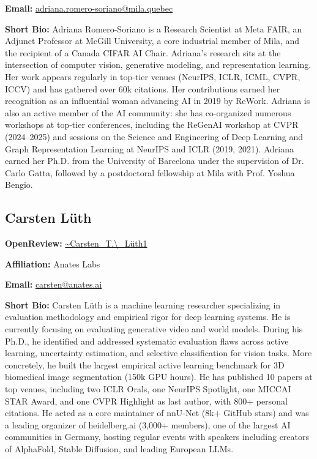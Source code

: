 \documentclass[11pt]{article}
\begin{document}
\textbf{Email:} \href{mailto:adriana.romero-soriano@mila.quebec}{adriana.romero-soriano@mila.quebec}


\textbf{Short Bio:} Adriana Romero-Soriano is a Research Scientist at Meta FAIR, an Adjunct Professor at McGill University, a core industrial member of Mila, and the recipient of a Canada CIFAR AI Chair. Adriana's research sits at the intersection of computer vision, generative modeling, and representation learning. Her work appears regularly in top-tier venues (NeurIPS, ICLR, ICML, CVPR, ICCV) and has gathered over 60k citations. Her contributions earned her recognition as an influential woman advancing AI in 2019 by ReWork. Adriana is also an active member of the AI community: she has co-organized numerous workshops at top-tier conferences, including the ReGenAI workshop at CVPR (2024--2025) and sessions on the Science and Engineering of Deep Learning and Graph Representation Learning at NeurIPS and ICLR (2019, 2021). Adriana earned her Ph.D. from the University of Barcelona under the supervision of Dr. Carlo Gatta, followed by a postdoctoral fellowship at Mila with Prof. Yoshua Bengio.


\subsection{Carsten Lüth}

\textbf{OpenReview:} \href{https://openreview.net/profile?id=\string~Carsten\_T.\_L\%C3\%BCth1}{\textasciitilde{}Carsten\_T.\textbackslash{}\_Lüth1}


\textbf{Affiliation:} Anates Labs


\textbf{Email:} \href{mailto:carsten@anates.ai}{carsten@anates.ai}


\textbf{Short Bio:} Carsten Lüth is a machine learning researcher specializing in evaluation methodology and empirical rigor for deep learning systems. He is currently focusing on evaluating generative video and world models. During his Ph.D., he identified and addressed systematic evaluation flaws across active learning, uncertainty estimation, and selective classification for vision tasks. More concretely, he built the largest empirical active learning benchmark for 3D biomedical image segmentation (150k GPU hours). He has published 10 papers at top venues, including two ICLR Orals, one NeurIPS Spotlight, one MICCAI STAR Award, and one CVPR Highlight as last author, with 800+ personal citations. He acted as a core maintainer of nnU-Net (8k+ GitHub stars) and was a leading organizer of heidelberg.ai (3,000+ members), one of the largest AI communities in Germany, hosting regular events with speakers including creators of AlphaFold, Stable Diffusion, and leading European LLMs.
\end{document}
